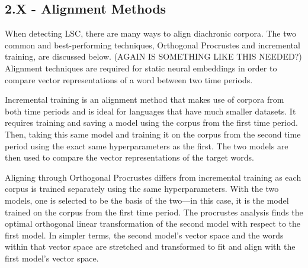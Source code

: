 \subsection{2.X - Alignment Methods}

When detecting LSC, there are many ways to align diachronic corpora. The two common and best-performing techniques, Orthogonal Procrustes and incremental training, are discussed below. (AGAIN IS SOMETHING LIKE THIS NEEDED?) Alignment techniques are required for static neural embeddings in order to compare vector representations of a word between two time periods. 

Incremental training is an alignment method that makes use of corpora from both time periods and is ideal for languages that have much smaller datasets. It requires training and saving a model using the corpus from the first time period. Then, taking this same model and training it on the corpus from the second time period using the exact same hyperparameters as the first. The two models are then used to compare the vector representations of the target words. 

Aligning through Orthogonal Procrustes differs from incremental training as each corpus is trained separately using the same hyperparameters. With the two models, one is selected to be the basis of the two—in this case, it is the model trained on the corpus from the first time period. The procrustes analysis finds the optimal orthogonal linear transformation of the second model with respect to the first model. In simpler terms, the second model’s vector space and the words within that vector space are stretched and transformed to fit and align with the first model’s vector space.